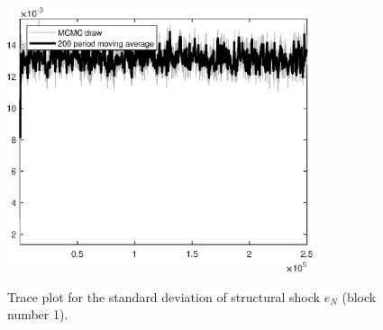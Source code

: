 \begin{figure}[H]
\centering
  \includegraphics[width=0.8\textwidth]{BRS_extended_fd/graphs/TracePlot_SE_e_N_blck_1}\\
    \caption{Trace plot for the standard deviation of structural shock ${e_N}$ (block number 1).}
\end{figure}
